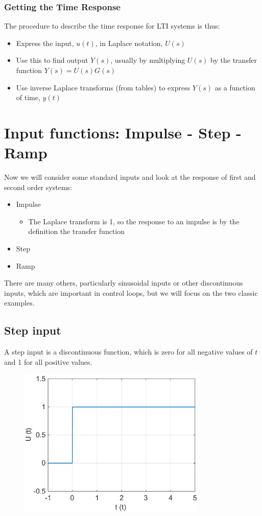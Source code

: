 \documentclass[class=report, crop=false, 12pt,a4paper, tikz, border=4mm]{standalone}
\begin{document}
\subsubsection{Getting the Time Response}
The procedure to describe the time response for LTI systems is thus:
\begin{itemize}
  \item Express the input, $u(t)$, in Laplace notation, $U(s)$
  \item Use this to find output $Y(s)$, usually by multiplying $U(s)$ by the transfer function $Y(s) = U(s)G(s)$
  \item Use inverse Laplace transforms (from tables) to express $Y(s)$ as a function of time, $y(t)$
\end{itemize}
\section{Input functions: Impulse - Step - Ramp}
Now we will consider some standard inputs and look at the response of first and second order systems:
\begin{itemize}
  \item Impulse
  \begin{itemize}
    \item The Laplace transform is 1, so the response to an impulse is by the definition the transfer function
  \end{itemize}
  \item Step
  \item Ramp
\end{itemize}
There are many others, particularly sinusoidal inputs or other discontinuous inputs, which are important in control loops, but we will focus on the two classic examples.
\subsection{Step input}
A step input is a discontinuous function, which is zero for all negative values of $t$ and 1 for all positive values.
\begin{figure}[H]
  \centering
  \includegraphics[width = 0.8\textwidth]{../img/diagram28.png}
\end{figure}
\end{document}
